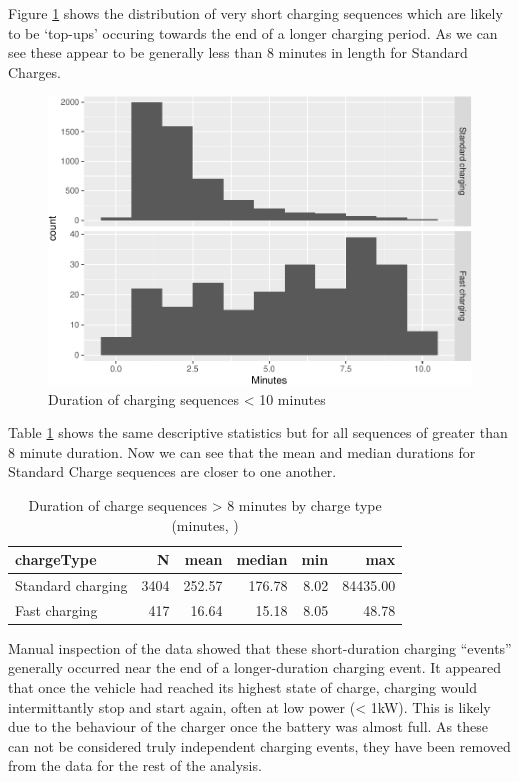 \documentclass[]{article}
\begin{document}
Figure \ref{fig:shortDuration} shows the distribution of very short
charging sequences which are likely to be `top-ups' occuring towards the
end of a longer charging period. As we can see these appear to be
generally less than 8 minutes in length for Standard Charges.

\begin{figure}
\centering
\includegraphics{EVBB_report_files/figure-latex/shortDuration-1.pdf}
\caption{\label{fig:shortDuration}Duration of charging sequences \textless{}
10 minutes}
\end{figure}

Table \ref{tab:durationDescTableReduced} shows the same descriptive
statistics but for all sequences of greater than 8 minute duration. Now
we can see that the mean and median durations for Standard Charge
sequences are closer to one another.

\begin{table}[t]

\caption{\label{tab:durationDescTableReduced}Duration of charge sequences > 8 minutes by charge type (minutes, )}
\centering
\begin{tabular}{l|r|r|r|r|r}
\hline
chargeType & N & mean & median & min & max\\
\hline
Standard charging & 3404 & 252.57 & 176.78 & 8.02 & 84435.00\\
\hline
Fast charging & 417 & 16.64 & 15.18 & 8.05 & 48.78\\
\hline
\end{tabular}
\end{table}

Manual inspection of the data showed that these short-duration charging
``events'' generally occurred near the end of a longer-duration charging
event. It appeared that once the vehicle had reached its highest state
of charge, charging would intermittantly stop and start again, often at
low power (\textless{} 1kW). This is likely due to the behaviour of the
charger once the battery was almost full. As these can not be considered
truly independent charging events, they have been removed from the data
for the rest of the analysis.
\end{document}
